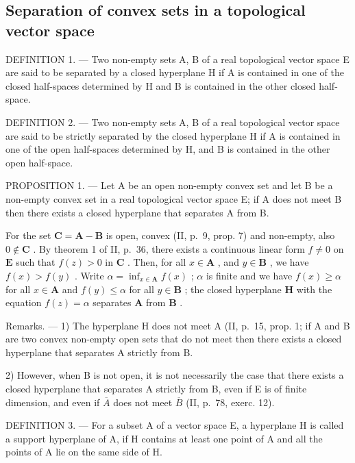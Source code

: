 \subsection{Separation of convex sets in a topological vector space}

DEFINITION 1. --- Two non-empty sets A, B of a real topological vector space E are said to be separated by a closed hyperplane H if A is contained in one of the closed half-spaces determined by H and B is contained in the other closed half-space.

DEFINITION 2. --- Two non-empty sets A, B of a real topological vector space are said to be strictly separated by the closed hyperplane H if A is contained in one of the open half-spaces determined by H, and B is contained in the other open half-space.

PROPOSITION 1. --- Let A be an open non-empty convex set and let B be a non-empty convex set in a real topological vector space E; if A does not meet B then there exists a closed hyperplane that separates A from B.

For the set \(\mathbf{C} = \mathbf{A} - \mathbf{B}\) is open, convex (II, p.~9, prop. 7) and non-empty, also \(0 \notin \mathbf{C}\) . By theorem 1 of II, p.~36, there exists a continuous linear form \(f \neq 0\) on \(\mathbf{E}\) such that \(f(z) > 0\) in \(\mathbf{C}\) . Then, for all \(x \in \mathbf{A}\) , and \(y \in \mathbf{B}\) , we have \(f(x) > f(y)\) . Write \(\alpha = \inf_{x \in \mathbf{A}} f(x)\) ; \(\alpha\) is finite and we have \(f(x) \geqslant \alpha\) for all \(x \in \mathbf{A}\) and \(f(y) \leqslant \alpha\) for all \(y \in \mathbf{B}\) ; the closed hyperplane \(\mathbf{H}\) with the equation \(f(z) = \alpha\) separates \(\mathbf{A}\) from \(\mathbf{B}\) .

Remarks. --- 1) The hyperplane H does not meet A (II, p.~15, prop. 1; if A and B are two convex non-empty open sets that do not meet then there exists a closed hyperplane that separates A strictly from B.

2) However, when B is not open, it is not necessarily the case that there exists a closed hyperplane that separates A strictly from B, even if E is of finite dimension, and even if \(\overline{A}\) does not meet \(\overline{B}\) (II, p.~78, exerc. 12).

DEFINITION 3. --- For a subset A of a vector space E, a hyperplane H is called a support hyperplane of A, if H contains at least one point of A and all the points of A lie on the same side of H.


